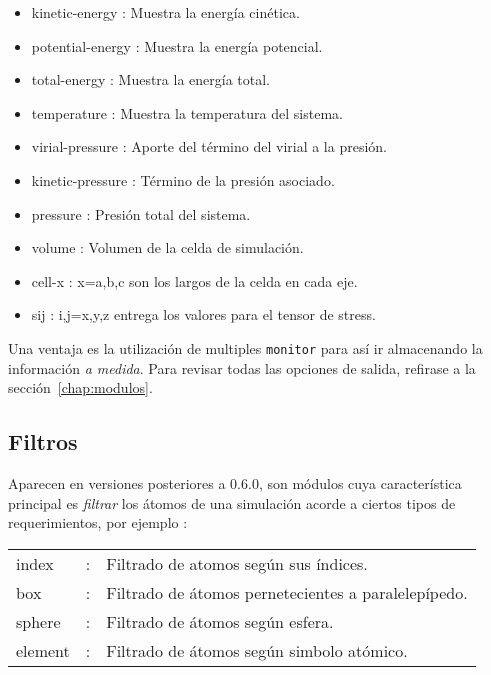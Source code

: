 \begin{itemize}
 \item kinetic-energy : Muestra la energ\'ia cin\'etica.
 \item potential-energy : Muestra la energ\'ia potencial.
 \item total-energy : Muestra la energ\'ia total.
 \item temperature : Muestra la temperatura del sistema.
 \item virial-pressure : Aporte del t\'ermino del virial a la presi\'on.
 \item kinetic-pressure : T\'ermino de la presi\'on asociado.
 \item pressure : Presi\'on total del sistema.
 \item volume : Volumen de la celda de simulaci\'on.
 \item cell-x : x=a,b,c son los largos de la celda en cada eje.
 \item sij : i,j=x,y,z entrega los valores para el tensor de stress.
\end{itemize}

Una ventaja es la utilizaci\'on de multiples \verb|monitor| para as\'i ir almacenando la informaci\'on \textit{a medida}. Para revisar todas las opciones de salida, refirase a la secci\'on~\ref{chap:modulos}.

\subsection{Filtros}

Aparecen en versiones posteriores a 0.6.0, son m\'odulos cuya caracter\'istica principal es \textit{filtrar} los \'atomos de una simulaci\'on acorde a ciertos tipos de requerimientos, por ejemplo :

\vspace{1cm}
\begin{center}
\begin{tabular}{lcl}
index &:& Filtrado de atomos seg\'un sus \'indices.\\
box &:& Filtrado de \'atomos pernetecientes a paralelep\'ipedo.\\
sphere &:& Filtrado de \'atomos seg\'un esfera.\\  
element &:& Filtrado de \'atomos seg\'un simbolo at\'omico.\\
\end{tabular}
\end{center}
\vspace{1cm}

